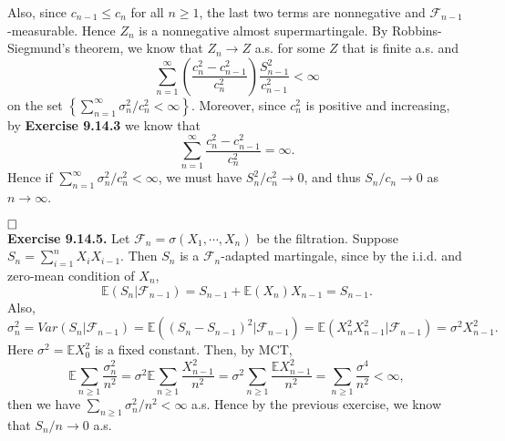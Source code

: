 \documentclass[12pt]{extarticle}
\begin{document}
Also, since $c_{n-1}\leq c_n$ for all $n\geq 1$, the last two terms are nonnegative and $\mathcal{F}_{n-1}$-measurable. Hence $Z_n$ is a nonnegative almost supermartingale.
By Robbins-Siegmund's theorem, we know that
$Z_n\rightarrow Z$ a.s. for some $Z$ that is finite a.s. and
\[
\sum_{n=1}^\infty\left(\frac{c_n^2-c_{n-1}^2}{c_n^2}\right)\frac{S_{n-1}^2}{c_{n-1}^2}<\infty
\]
on the set $\left\{\sum_{n=1}^\infty\sigma^2_n/c_n^2<\infty\right\}$.
Moreover, since $c_n^2$ is positive and increasing, by \textbf{Exercise 9.14.3} we know that
\[
\sum_{n=1}^\infty\frac{c_{n}^2-c_{n-1}^2}{c_n^2}=\infty.
\]
Hence if $\sum_{n=1}^\infty\sigma_n^2/c_n^2<\infty$, we must have $S_n^2/c_n^2\rightarrow 0$, and thus $S_n/c_n\rightarrow 0$ as $n\rightarrow\infty$.


$\hspace{\fill}\square$
\\
\textbf{Exercise 9.14.5.} Let $\mathcal{F}_n=\sigma(X_1,\cdots,X_n)$ be the filtration. Suppose $S_n=\sum_{i=1}^nX_iX_{i-1}$. Then $S_n$ is a $\mathcal{F}_n$-adapted martingale, since by the i.i.d. and zero-mean condition of $X_n$,
\[
\mathbb{E}(S_n|\mathcal{F}_{n-1})=S_{n-1}+\mathbb{E}(X_n)X_{n-1}=S_{n-1}.
\]
Also,
\[
\sigma_n^2=Var(S_n|\mathcal{F}_{n-1})=\mathbb{E}\left((S_n-S_{n-1})^2|\mathcal{F}_{n-1}\right)=\mathbb{E}(X_n^2X_{n-1}^2|\mathcal{F}_{n-1})=\sigma^2X_{n-1}^2.
\]
Here $\sigma^2=\mathbb{E}X_0^2$ is a fixed constant. Then, by MCT,
\[
\mathbb{E}\sum_{n\geq 1}\frac{\sigma_n^2}{n^2}=\sigma^2\mathbb{E}\sum_{n\geq 1}\frac{X_{n-1}^2}{n^2}=\sigma^2\sum_{n\geq 1}\frac{\mathbb{E}X_{n-1}^2}{n^2}=\sum_{n\geq 1}\frac{\sigma^4}{n^2}<\infty,
\]
then we have $\sum_{n\geq 1}\sigma_n^2/n^2<\infty$ a.s. Hence by the previous exercise, we know that $S_n/n\rightarrow 0$ a.s.
\end{document}

